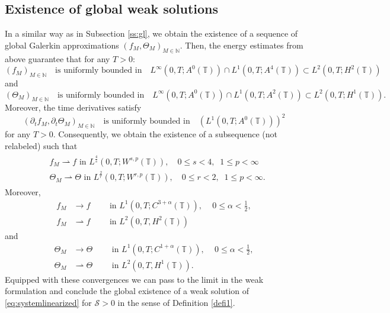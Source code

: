 \documentclass[reqno,11pt]{amsart}
\newcommand{\NN}{{\mathbb N}}
\newcommand{\TT}{{\mathbb T}}
\begin{document}
{\subsection{Existence of global weak solutions} In a similar way as in Subsection \ref{ss:gl}, we obtain the existence of a sequence of global Galerkin approximations $(f_M,\Theta_M)_{M\in\NN}$. Then, the energy estimates from above guarantee that for any $T>0$:
$$
(f_M)_{M\in\NN}\quad\mbox{is uniformly bounded in}\quad  L^\infty(0,T; A^0(\TT))\cap  L^1(0,T;A^4(\TT))\subset  L^2(0,T;H^2(\TT))
$$
and
$$
(\Theta_M)_{M\in\NN}\quad\mbox{is uniformly bounded in}\quad L^\infty(0,T; A^0(\TT))\cap L^1(0,T;A^2(\TT))\subset   L^2(0,T;H^1(\TT)).
$$
Moreover, the time derivatives satisfy
$$
(\partial_t f_M,\partial_t \Theta_M)_{M\in\NN}\quad\mbox{is uniformly bounded in}\quad \left(L^1(0,T;A^0(\TT))\right)^2
$$
for any $T>0$. Consequently, we obtain the existence of a subsequence (not relabeled) such that
\begin{align}\label{eq:Linf}
\begin{split}
&f_M\rightharpoonup  f\text {   in $L^{\frac{4}{s}}(0,T; W^{s,p}(\TT))$},\quad 0\leq s<4,\;\;1\leq p<\infty\\
&\Theta_M\rightharpoonup  \Theta\text {   in $L^{\frac{2}{r}}(0,T; W^{r,p}(\TT))$} ,\quad 0\leq r<2,\;\;1\leq p<\infty.
\end{split}
\end{align}
Moreover,
\begin{align*}
f_M&\rightarrow f\qquad \text{ in $L^1(0,T;C^{3+\alpha}(\TT))$}, \quad \,0\leq \alpha<\frac{1}{2},\\
f_M&\rightharpoonup f\qquad \text{ in $L^2(0,T, H^2(\TT))$}
\end{align*}
and 
\begin{align*}
\Theta_M&\rightarrow \Theta\qquad \text{ in $L^1(0,T;C^{1+\alpha}(\TT))$},\quad  \,0\leq \alpha<\frac{1}{2},\\
\Theta_M&\rightharpoonup \Theta\qquad \text{ in $L^2(0,T, H^1(\TT))$}.
\end{align*}
Equipped with these convergences we can pass to the limit in the weak formulation and conclude the global existence of a weak solution of \eqref{eq:systemlinearized} for $\mathcal S>0$ in the sense of Definition \ref{defi1}.

}
\end{document}
